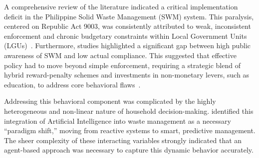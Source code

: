 A comprehensive review of the literature indicated a critical implementation deficit in the Philippine Solid Waste Management (SWM) system. This paralysis, centered on Republic Act 9003, was consistently attributed to weak, inconsistent enforcement and chronic budgetary constraints within Local Government Units (LGUs)~\citep{Santos2025, Sagodaquil2023}. Furthermore, studies highlighted a significant gap between high public awareness of SWM and low actual compliance. This suggested that effective policy had to move beyond simple enforcement, requiring a strategic blend of hybrid reward-penalty schemes and investments in non-monetary levers, such as education, to address core behavioral flaws~\citep{Catiil2025, Chen2023}.

Addressing this behavioral component was complicated by the highly heterogeneous and non-linear nature of household decision-making. \citet{Olawade2024} identified this integration of Artificial Intelligence into waste management as a necessary ``paradigm shift,'' moving from reactive systems to smart, predictive management. The sheer complexity of these interacting variables strongly indicated that an agent-based approach was necessary to capture this dynamic behavior accurately.


